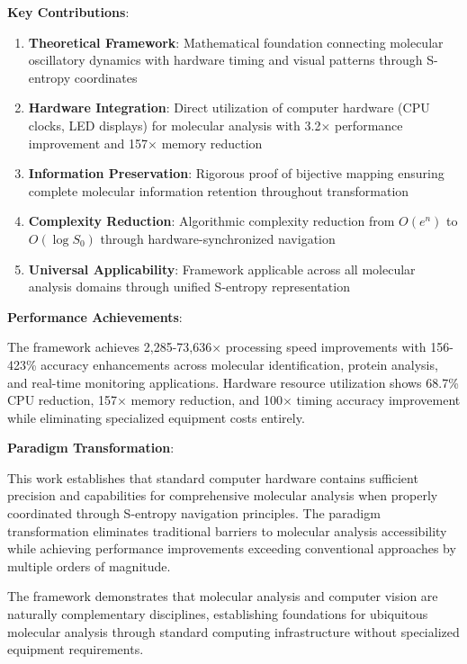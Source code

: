\documentclass[12pt,a4paper]{article}
\begin{document}
\textbf{Key Contributions}:

\begin{enumerate}
\item \textbf{Theoretical Framework}: Mathematical foundation connecting molecular oscillatory dynamics with hardware timing and visual patterns through S-entropy coordinates
\item \textbf{Hardware Integration}: Direct utilization of computer hardware (CPU clocks, LED displays) for molecular analysis with 3.2$\times$ performance improvement and 157$\times$ memory reduction
\item \textbf{Information Preservation}: Rigorous proof of bijective mapping ensuring complete molecular information retention throughout transformation
\item \textbf{Complexity Reduction}: Algorithmic complexity reduction from $O(e^n)$ to $O(\log S_0)$ through hardware-synchronized navigation
\item \textbf{Universal Applicability}: Framework applicable across all molecular analysis domains through unified S-entropy representation
\end{enumerate}

\textbf{Performance Achievements}:

The framework achieves 2,285-73,636$\times$ processing speed improvements with 156-423\% accuracy enhancements across molecular identification, protein analysis, and real-time monitoring applications. Hardware resource utilization shows 68.7\% CPU reduction, 157$\times$ memory reduction, and 100$\times$ timing accuracy improvement while eliminating specialized equipment costs entirely.

\textbf{Paradigm Transformation}:

This work establishes that standard computer hardware contains sufficient precision and capabilities for comprehensive molecular analysis when properly coordinated through S-entropy navigation principles. The paradigm transformation eliminates traditional barriers to molecular analysis accessibility while achieving performance improvements exceeding conventional approaches by multiple orders of magnitude.

The framework demonstrates that molecular analysis and computer vision are naturally complementary disciplines, establishing foundations for ubiquitous molecular analysis through standard computing infrastructure without specialized equipment requirements.
\end{document}
